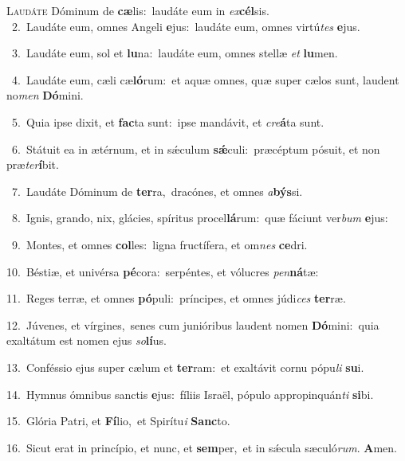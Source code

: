 \lettrine{\initial\textcolor{\initialcolor}{L}}{audáte} Dóminum de \textbf{cæ}\-lis:~\star laudáte eum in \textit{ex}\-\textbf{cél}sis.\\
{\numbfont\textcolor{\numbcolor}{~2.}}~Laudáte eum, omnes Angeli \textbf{e}\-jus:~\star laudáte eum, omnes virtú\textit{tes} \textbf{e}\-jus.\par
{\numbfont\textcolor{\numbcolor}{~3.}}~Laudáte eum, sol et \textbf{lu}\-na:~\star laudáte eum, omnes stellæ \textit{et} \textbf{lu}\-men.\par
{\numbfont\textcolor{\numbcolor}{~4.}}~Laudáte eum, cæli cæ\-\textbf{ló}\-rum:~\star et aquæ omnes, quæ super cælos sunt, laudent no\textit{men} \textbf{Dó}\-mini.\par
{\numbfont\textcolor{\numbcolor}{~5.}}~Quia ipse dixit, et \textbf{fac}\-ta sunt:~\star ipse mandávit, et \textit{cre}\-\textbf{á}ta sunt.\par
{\numbfont\textcolor{\numbcolor}{~6.}}~Státuit ea in ætérnum, et in sǽculum \textbf{sǽ}\-culi:~\star præcéptum pósuit, et non præ\-\textit{ter}\-\textbf{í}bit.\par
{\numbfont\textcolor{\numbcolor}{~7.}}~Laudáte Dóminum de \textbf{ter}\-ra,~\star dracónes, et omnes \textit{a}\-\textbf{býs}si.\par
{\numbfont\textcolor{\numbcolor}{~8.}}~Ignis, grando, nix, glácies, spíritus procel\-\textbf{lá}\-rum:~\star quæ fáciunt ver\textit{bum} \textbf{e}\-jus:\par
{\numbfont\textcolor{\numbcolor}{~9.}}~Montes, et omnes \textbf{col}\-les:~\star ligna fructífera, et om\textit{nes} \textbf{ce}\-dri.\par
{\numbfont\textcolor{\numbcolor}{10.}}~Béstiæ, et univérsa \textbf{pé}\-cora:~\star serpéntes, et vólucres \textit{pen}\-\textbf{ná}tæ:\par
{\numbfont\textcolor{\numbcolor}{11.}}~Reges terræ, et omnes \textbf{pó}\-puli:~\star príncipes, et omnes júdi\textit{ces} \textbf{ter}\-ræ.\par
{\numbfont\textcolor{\numbcolor}{12.}}~Júvenes, et vírgines,~\dagger senes cum junióribus laudent nomen \textbf{Dó}\-mini:~\star quia exaltátum est nomen ejus \textit{so}\-\textbf{lí}us.\par
{\numbfont\textcolor{\numbcolor}{13.}}~Conféssio ejus super cælum et \textbf{ter}\-ram:~\star et exaltávit cornu pópu\textit{li} \textbf{su}\-i.\par
{\numbfont\textcolor{\numbcolor}{14.}}~Hymnus ómnibus sanctis \textbf{e}\-jus:~\star fíliis Israël, pópulo appropinquán\textit{ti} \textbf{si}\-bi.\par
{\numbfont\textcolor{\numbcolor}{15.}}~Glória Patri, et \textbf{Fí}\-lio,~\star et Spirítu\textit{i} \textbf{Sanc}\-to.\par
{\numbfont\textcolor{\numbcolor}{16.}}~Sicut erat in princípio, et nunc, et \textbf{sem}\-per,~\star et in sǽcula sæculó\-\textit{rum}\-. \textbf{A}\-men.\par
